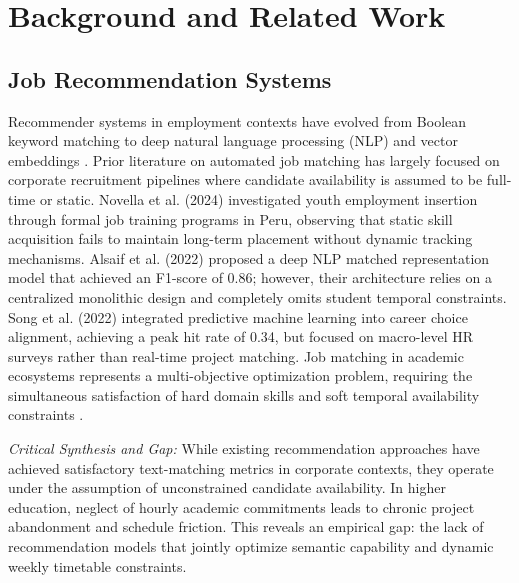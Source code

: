 \documentclass[a4paper,fleqn]{cas-dc}
\begin{document}
\section{Background and Related Work}
\label{sec:related}

\subsection{Job Recommendation Systems}
Recommender systems in employment contexts have evolved from Boolean keyword matching to deep natural language processing (NLP) and vector embeddings \cite{alsaif2022, ertugrul2025}. Prior literature on automated job matching has largely focused on corporate recruitment pipelines where candidate availability is assumed to be full-time or static. Novella et al. (2024) \cite{novella2024} investigated youth employment insertion through formal job training programs in Peru, observing that static skill acquisition fails to maintain long-term placement without dynamic tracking mechanisms. Alsaif et al. (2022) \cite{alsaif2022} proposed a deep NLP matched representation model that achieved an F1-score of 0.86; however, their architecture relies on a centralized monolithic design and completely omits student temporal constraints. Song et al. (2022) \cite{song2022} integrated predictive machine learning into career choice alignment, achieving a peak hit rate of 0.34, but focused on macro-level HR surveys rather than real-time project matching. Job matching in academic ecosystems represents a multi-objective optimization problem, requiring the simultaneous satisfaction of hard domain skills and soft temporal availability constraints \cite{song2022, rebaza2025, gadegaonkar2023}.

\medskip\noindent\textit{Critical Synthesis and Gap:} While existing recommendation approaches have achieved satisfactory text-matching metrics in corporate contexts, they operate under the assumption of unconstrained candidate availability. In higher education, neglect of hourly academic commitments leads to chronic project abandonment and schedule friction. This reveals an empirical gap: the lack of recommendation models that jointly optimize semantic capability and dynamic weekly timetable constraints.
\end{document}
